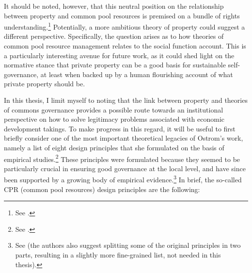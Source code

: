It should be noted, however, that this neutral position on the relationship between property and common pool resources is premised on a bundle of rights understanding.\footnote{See \cite[59]{ostrom10b}.} Potentially, a more ambitious theory of property could suggest a different perspective. Specifically, the question arises as to how theories of common pool resource management relates to the social function account. This is a particularly interesting avenue for future work, as it could shed light on the normative stance that private property can be a good basis for sustainable self-governance, at least when backed up by a human flourishing account of what private property should be.

In this thesis, I limit myself to noting that the link between property and theories of commons governance provides a possible route towards an institutional perspective on how to solve legitimacy problems associated with economic development takings. To make progress in this regard, it will be useful to first briefly consider one of the most important theoretical legacies of Ostrom's work, namely a list of eight design principles that she formulated on the basis of empirical studies.\footnote{See \cite[90]{ostrom90}.} These principles were formulated because they seemed to be particularly crucial in ensuring good governance at the local level, and have since been supported by a growing body of empirical evidence.\footnote{See \cite{cox10} (the authors also suggest splitting some of the original principles in two parts, resulting in a slightly more fine-grained list, not needed in this thesis). } In brief, the so-called CPR (common pool resources) design principles are the following:

